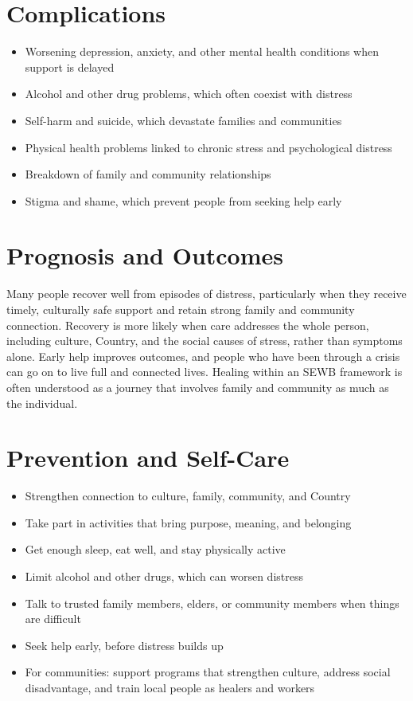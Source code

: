 \section*{Complications}
\begin{itemize}
    \item Worsening depression, anxiety, and other mental health conditions when support is delayed
    \item Alcohol and other drug problems, which often coexist with distress
    \item Self-harm and suicide, which devastate families and communities
    \item Physical health problems linked to chronic stress and psychological distress
    \item Breakdown of family and community relationships
    \item Stigma and shame, which prevent people from seeking help early
\end{itemize}

\section*{Prognosis and Outcomes}
Many people recover well from episodes of distress, particularly when they receive timely, culturally safe support and retain strong family and community connection. Recovery is more likely when care addresses the whole person, including culture, Country, and the social causes of stress, rather than symptoms alone. Early help improves outcomes, and people who have been through a crisis can go on to live full and connected lives. Healing within an SEWB framework is often understood as a journey that involves family and community as much as the individual.

\section*{Prevention and Self-Care}
\begin{itemize}
    \item Strengthen connection to culture, family, community, and Country
    \item Take part in activities that bring purpose, meaning, and belonging
    \item Get enough sleep, eat well, and stay physically active
    \item Limit alcohol and other drugs, which can worsen distress
    \item Talk to trusted family members, elders, or community members when things are difficult
    \item Seek help early, before distress builds up
    \item For communities: support programs that strengthen culture, address social disadvantage, and train local people as healers and workers
\end{itemize}


